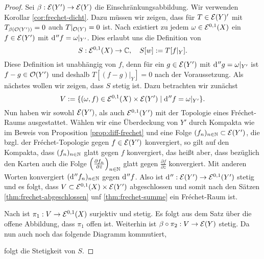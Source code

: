 \begin{proof}
  Sei $\beta: \mathcal{E}(Y') \rightarrow \mathcal{E}(Y)$ die Einschränkungsabbildung. Wir
  verwenden Korollar \ref{cor:frechet-dicht}. Dazu müssen wir zeigen, dass für $T \in
  \mathcal{E}(Y)'$ mit $T_{\beta(\mathcal{O}(Y'))} = 0$ auch $T|_{\mathcal{O}(Y)}
  = 0$ ist. 
  Nach \cite[Kor. 14.16]{For} existiert zu jedem $\omega \in \mathcal{E}^{0,1}(X)$ ein $f \in
  \mathcal{E}(Y')$ mit $\d[''f] = \omega|_{Y'}$. 
  Dies erlaubt uns die Definition von
  \[
  S: \mathcal{E}^{0,1}(X) \rightarrow \mathbb{C}, \quad S[w] := T[f|_Y].
  \]
  Diese Definition ist unabhängig von $f$, denn für
  ein $g \in \mathcal{E}(Y')$ mit $\d[''g] = \omega|_{Y'}$ ist $f-g
  \in \mathcal{O}(Y')$ und deshalb $T[(f-g)|_Y] = 0$ nach der Voraussetzung.
  Als nächstes wollen wir zeigen, dass $S$ stetig ist. 
  Dazu betrachten wir zunächst
  \[
  V := \{ (\omega, f) \in \diff^{0,1}(X) \times \diff(Y') \mid \d[''f] = \omega|_{Y'} \}.
  \]
  Nun haben wir
  sowohl $\mathcal{E}(Y')$, als auch $\mathcal{E}^{0,1}(Y')$ mit der Topologie
  eines Fr\'echet-Raums ausgestattet. Wählen wir eine Überdeckung von
  $Y'$ durch Kompakta wie im Beweis von Proposition
  \ref{prop:diff-frechet} und eine Folge $(f_n)_{n\in \mathbb{N}} \subset
  \mathcal{E}(Y')$, die bzgl. der Fr\'echet-Topologie gegen $f \in \mathcal{E}(Y')$
  konvergiert, so gilt auf den Kompakta, dass $(f_n)_{n\in \mathbb{N}}$ glatt
  gegen $f$ konvergiert, das heißt aber, dass bezüglich den Karten
  auch die Folge $\left(\frac{\partial f_n}{\partial \bar z} \right
  )_{n \in\mathbb{N}}$ glatt gegen $\frac{\partial f}{\partial \bar
      z}$ konvergiert. Mit anderen Worten konvergiert
    $(\d[''f_n])_{n\in \N}$ gegen $\d[''f]$. Also ist 
  $\d['']: \diff(Y') \ra \diff^{0,1}(Y')$ stetig und es folgt, dass $V
  \subset \mathcal{E}^{0,1}(X) \times \mathcal{E}(Y')$ abgeschlossen und somit
  nach den Sätzen \ref{thm:frechet-abgeschlossen} unf \ref{thm:frechet-summe} ein
  Fr\'echet-Raum ist.
  
  Nach \cite[Kor. 14.16]{For} ist $\pi_1: V \rightarrow \mathcal{E}^{0,1}(X)$
  surjektiv und stetig. Es folgt aus dem Satz über die offene
  Abbildung, dass $\pi_1$ offen ist.
  Weiterhin ist $\beta \circ \pi_2 : V \rightarrow \mathcal{E}(Y)$ stetig. Da nun
  auch noch das folgende Diagramm kommutiert,
  \begin{center}
  \end{center}
  folgt die Stetigkeit von $S$.


\end{proof}
